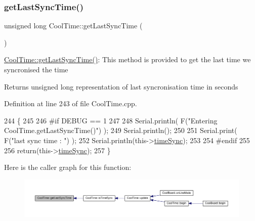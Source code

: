 \mbox{\label{class_cool_time_a5d17f707a9d337720493b2bce9d41c21}} 
\subsubsection{\texorpdfstring{get\+Last\+Sync\+Time()}{getLastSyncTime()}}
{\footnotesize\ttfamily unsigned long Cool\+Time\+::get\+Last\+Sync\+Time (\begin{DoxyParamCaption}{ }\end{DoxyParamCaption})}

\hyperlink{class_cool_time_a5d17f707a9d337720493b2bce9d41c21}{Cool\+Time\+::get\+Last\+Sync\+Time()}\+: This method is provided to get the last time we syncronised the time

\begin{DoxyReturn}{Returns}
unsigned long representation of last syncronisation time in seconds 
\end{DoxyReturn}


Definition at line 243 of file Cool\+Time.\+cpp.


\begin{DoxyCode}
244 \{
245 
246 \textcolor{preprocessor}{#if DEBUG == 1 }
247 
248     Serial.println( F(\textcolor{stringliteral}{"Entering CoolTime.getLastSyncTime()"}) );
249     Serial.println();
250     
251     Serial.print( F(\textcolor{stringliteral}{"last sync time : "}) );
252     Serial.println(this->\hyperlink{class_cool_time_a9d032e76c3470a15b3bbbc52af6463f7}{timeSync});
253 
254 \textcolor{preprocessor}{#endif }
255 
256     \textcolor{keywordflow}{return}(this->\hyperlink{class_cool_time_a9d032e76c3470a15b3bbbc52af6463f7}{timeSync});
257 \}
\end{DoxyCode}
Here is the caller graph for this function\+:\nopagebreak
\begin{figure}[H]
\begin{center}
\leavevmode
\includegraphics[width=350pt]{d6/d49/class_cool_time_a5d17f707a9d337720493b2bce9d41c21_icgraph}
\end{center}
\end{figure}
\mbox{\label{class_cool_time_a41fbbbfd651c2079f54d4b2911e4c705}} 
